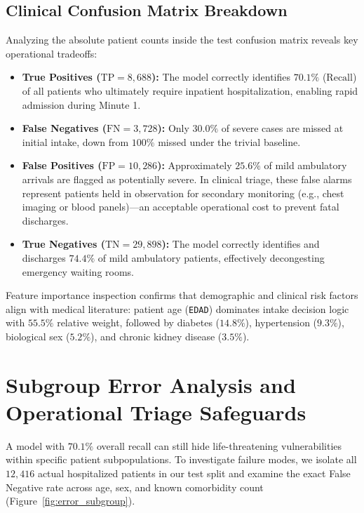 \documentclass{article}
\begin{document}
\subsection{Clinical Confusion Matrix Breakdown}
Analyzing the absolute patient counts inside the test confusion matrix reveals key operational tradeoffs:
\begin{itemize}
    \item \textbf{True Positives ($\text{TP}=8,688$):} The model correctly identifies $70.1\%$ ($\text{Recall}$) of all patients who ultimately require inpatient hospitalization, enabling rapid admission during Minute 1.
    \item \textbf{False Negatives ($\text{FN}=3,728$):} Only $30.0\%$ of severe cases are missed at initial intake, down from $100\%$ missed under the trivial baseline.
    \item \textbf{False Positives ($\text{FP}=10,286$):} Approximately $25.6\%$ of mild ambulatory arrivals are flagged as potentially severe. In clinical triage, these false alarms represent patients held in observation for secondary monitoring (e.g., chest imaging or blood panels)—an acceptable operational cost to prevent fatal discharges.
    \item \textbf{True Negatives ($\text{TN}=29,898$):} The model correctly identifies and discharges $74.4\%$ of mild ambulatory patients, effectively decongesting emergency waiting rooms.
\end{itemize}

Feature importance inspection confirms that demographic and clinical risk factors align with medical literature: patient age (\texttt{EDAD}) dominates intake decision logic with $55.5\%$ relative weight, followed by diabetes ($14.8\%$), hypertension ($9.3\%$), biological sex ($5.2\%$), and chronic kidney disease ($3.5\%$).

\section{Subgroup Error Analysis and Operational Triage Safeguards}
\label{sec:error_analysis}

A model with $70.1\%$ overall recall can still hide life-threatening vulnerabilities within specific patient subpopulations. To investigate failure modes, we isolate all $12,416$ actual hospitalized patients in our test split and examine the exact False Negative rate across age, sex, and known comorbidity count (Figure~\ref{fig:error_subgroup}).
\end{document}
